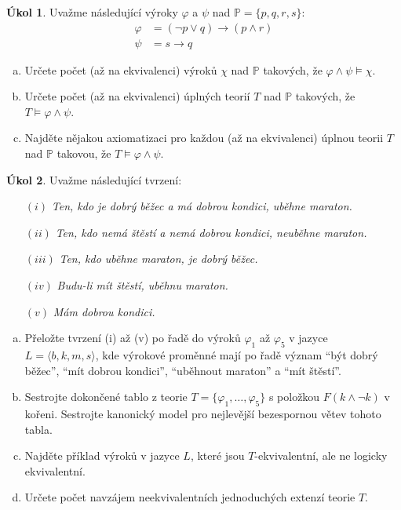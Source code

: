 \documentclass[a4paper]{amsart}
\theoremstyle{definition}
\newtheorem{task}{Úkol}
\begin{document}
\begin{task}
Uvažme následující výroky $\varphi$ a $\psi$ nad $\mathbb P=\{p, q, r, s\}$:
\begin{align*}
    \varphi &= (\neg p \vee  q)\to(p\wedge r)\\
    \psi &= s\to q
\end{align*}
\begin{enumerate}[(a)]
    \item Určete počet (až na ekvivalenci) výroků $\chi$ nad $\mathbb P$ takových, že $\varphi\wedge\psi\models\chi$.
    \item Určete počet (až na ekvivalenci) úplných teorií $T$ nad $\mathbb P$ takových, že $T\models\varphi\wedge\psi$.
    \item Najděte nějakou axiomatizaci pro každou (až na ekvivalenci) úplnou teorii $T$ nad $\mathbb P$ takovou, že $T\models\varphi\wedge\psi$.
\end{enumerate}


\end{task}


\begin{task}
Uvažme následující tvrzení:
\begin{enumerate}
\item[$(i)$] {\it Ten, kdo je dobrý běžec a má dobrou kondici, uběhne maraton.}
\item[$(ii)$] {\it Ten, kdo nemá štěstí a nemá dobrou kondici, neuběhne maraton.}
\item[$(iii)$]{\it Ten, kdo uběhne maraton, je dobrý běžec.}
\item[$(iv)$] {\it Budu-li mít štěstí, uběhnu maraton.}
\item[$(v)$] {\it Mám dobrou kondici.}
\end{enumerate}


\begin{enumerate}[(a)]
\item Přeložte tvrzení (i) až (v) po řadě do výroků $\varphi_1$ až $\varphi_5$ v jazyce $L=\langle b, k, m, s\rangle$, kde výrokové proměnné mají po řadě význam ``být dobrý běžec'', ``mít dobrou kondici'', ``uběhnout maraton'' a ``mít štěstí''.
\item Sestrojte dokončené tablo z teorie $T=\{\varphi_1,\dots,\varphi_5\}$ s položkou $F (k \wedge \neg k)$ v kořeni. Sestrojte kanonický model pro nejlevější bezespornou větev tohoto tabla.

\item Najděte příklad výroků v jazyce $L$, které jsou $T$-ekvivalentní, ale ne logicky ekvivalentní. 
\item Určete počet navzájem neekvivalentních jednoduchých extenzí teorie $T$.
\end{enumerate}
\end{task}
\end{document}
